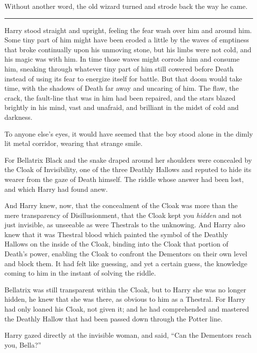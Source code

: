 Without another word, the old wizard turned and strode back the way he came.

\begin{center}\rule{3in}{0.4pt}\end{center}

Harry stood straight and upright, feeling the fear wash over him and around him. Some tiny part of him might have been eroded a little by the waves of emptiness that broke continually upon his unmoving stone, but his limbs were not cold, and his magic was with him. In time those waves might corrode him and consume him, sneaking through whatever tiny part of him still cowered before Death instead of using its fear to energize itself for battle. But that doom would take time, with the shadows of Death far away and uncaring of him. The flaw, the crack, the fault-line that was in him had been repaired, and the stars blazed brightly in his mind, vast and unafraid, and brilliant in the midst of cold and darkness.

To anyone else's eyes, it would have seemed that the boy stood alone in the dimly lit metal corridor, wearing that strange smile.

For Bellatrix Black and the snake draped around her shoulders were concealed by the Cloak of Invisibility, one of the three Deathly Hallows and reputed to hide its wearer from the gaze of Death himself. The riddle whose answer had been lost, and which Harry had found anew.

And Harry knew, now, that the concealment of the Cloak was more than the mere transparency of Disillusionment, that the Cloak kept you \emph{hidden} and not just invisible, as unseeable as were Thestrals to the unknowing. And Harry also knew that it was Thestral blood which painted the symbol of the Deathly Hallows on the inside of the Cloak, binding into the Cloak that portion of Death's power, enabling the Cloak to confront the Dementors on their own level and block them. It had felt like guessing, and yet a certain guess, the knowledge coming to him in the instant of solving the riddle.

Bellatrix was still transparent within the Cloak, but to Harry she was no longer hidden, he knew that she was there, as obvious to him as a Thestral. For Harry had only loaned his Cloak, not given it; and he had comprehended and mastered the Deathly Hallow that had been passed down through the Potter line.

Harry gazed directly at the invisible woman, and said, ``Can the Dementors reach you, Bella?''


